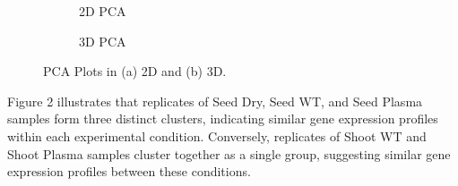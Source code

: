 \documentclass[12pt,letterpaper]{article}
\begin{document}
\begin{figure}[H]
\begin{subfigure}[b]{0.5\textwidth}
    \centering
    \caption{2D PCA}
    \label{fig:enter-label}
\end{subfigure}
\begin{subfigure}[b]{0.5\textwidth}
    \centering
    \caption{3D PCA}
    \label{fig:enter-label}
\end{subfigure}
\caption{PCA Plots in (a) 2D and (b) 3D.}
\end{figure}

Figure 2 illustrates that replicates of Seed Dry, Seed WT, and Seed Plasma samples form three distinct clusters, indicating similar gene expression profiles within each experimental condition. Conversely, replicates of Shoot WT and Shoot Plasma samples cluster together as a single group, suggesting similar gene expression profiles between these conditions.
\end{document}
